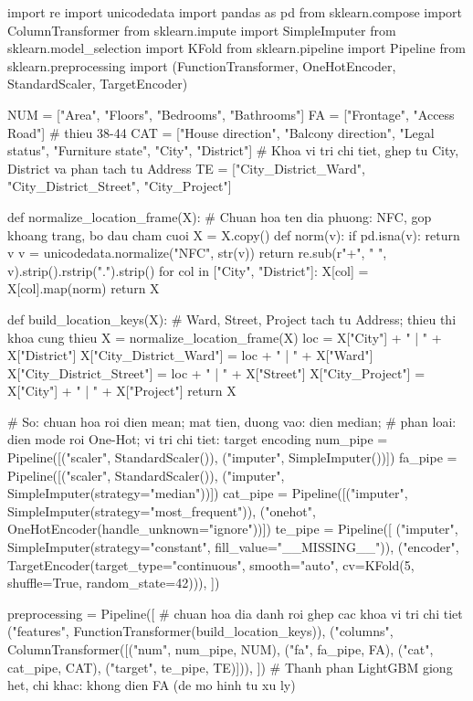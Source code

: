 \documentclass[11pt]{article}
\begin{document}
\begin{codebox}[title={Pipeline tiền xử lý của thành phần XGBoost trong mô hình cuối}, breakable]
import re
import unicodedata
import pandas as pd
from sklearn.compose import ColumnTransformer
from sklearn.impute import SimpleImputer
from sklearn.model_selection import KFold
from sklearn.pipeline import Pipeline
from sklearn.preprocessing import (FunctionTransformer, OneHotEncoder,
                                   StandardScaler, TargetEncoder)

NUM = ["Area", "Floors", "Bedrooms", "Bathrooms"]
FA = ["Frontage", "Access Road"]          # thieu 38-44%
CAT = ["House direction", "Balcony direction", "Legal status",
       "Furniture state", "City", "District"]
# Khoa vi tri chi tiet, ghep tu City, District va phan tach tu Address
TE = ["City_District_Ward", "City_District_Street", "City_Project"]

def normalize_location_frame(X):
    # Chuan hoa ten dia phuong: NFC, gop khoang trang, bo dau cham cuoi
    X = X.copy()
    def norm(v):
        if pd.isna(v):
            return v
        v = unicodedata.normalize("NFC", str(v))
        return re.sub(r"\s+", " ", v).strip().rstrip(".").strip()
    for col in ["City", "District"]:
        X[col] = X[col].map(norm)
    return X

def build_location_keys(X):
    # Ward, Street, Project tach tu Address; thieu thi khoa cung thieu
    X = normalize_location_frame(X)
    loc = X["City"] + " | " + X["District"]
    X["City_District_Ward"] = loc + " | " + X["Ward"]
    X["City_District_Street"] = loc + " | " + X["Street"]
    X["City_Project"] = X["City"] + " | " + X["Project"]
    return X

# So: chuan hoa roi dien mean; mat tien, duong vao: dien median;
# phan loai: dien mode roi One-Hot; vi tri chi tiet: target encoding
num_pipe = Pipeline([("scaler", StandardScaler()),
                     ("imputer", SimpleImputer())])
fa_pipe = Pipeline([("scaler", StandardScaler()),
                    ("imputer", SimpleImputer(strategy="median"))])
cat_pipe = Pipeline([("imputer", SimpleImputer(strategy="most_frequent")),
                     ("onehot", OneHotEncoder(handle_unknown="ignore"))])
te_pipe = Pipeline([
    ("imputer", SimpleImputer(strategy="constant",
                              fill_value="__MISSING__")),
    ("encoder", TargetEncoder(target_type="continuous", smooth="auto",
                              cv=KFold(5, shuffle=True, random_state=42))),
])

preprocessing = Pipeline([
    # chuan hoa dia danh roi ghep cac khoa vi tri chi tiet
    ("features", FunctionTransformer(build_location_keys)),
    ("columns", ColumnTransformer([("num", num_pipe, NUM),
                                   ("fa", fa_pipe, FA),
                                   ("cat", cat_pipe, CAT),
                                   ("target", te_pipe, TE)])),
])
# Thanh phan LightGBM giong het, chi khac: khong dien FA (de mo hinh tu xu ly)
\end{codebox}
\end{document}

